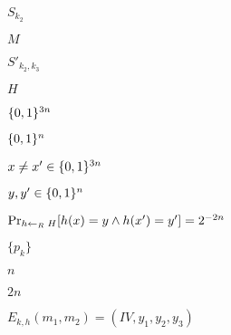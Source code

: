 \documentclass[10pt]{book}
\begin{document}
\begin{mdSnippets}
\begin{mdInlineSnippet}[0747e9221e93cfb00d3d40d118a88239]%
$S_{k_2}$\end{mdInlineSnippet}%
\begin{mdInlineSnippet}[69691c7bdcc3ce6d5d8a1361f22d04ac]%
$M$\end{mdInlineSnippet}%
\begin{mdInlineSnippet}[2241c878d01fb10bcb89591e5e72a22e]%
$S'_{k_2,k_3}$\end{mdInlineSnippet}%
\begin{mdInlineSnippet}[c1d9f50f86825a1a2302ec2449c17196]%
$H$\end{mdInlineSnippet}%
\begin{mdInlineSnippet}[6ba5b9daf1470df4cc0a64e898d406e0]%
$\{0,1\}^{3n}$\end{mdInlineSnippet}%
\begin{mdInlineSnippet}[5867c9b098884eca2779f6d98d4b0b29]%
$\{0,1\}^n$\end{mdInlineSnippet}%
\begin{mdInlineSnippet}%
$x\neq x'\in\{0,1\}^{3n}$\end{mdInlineSnippet}%
\begin{mdInlineSnippet}[202fde142b896c250ab7b35d3d6ad30f]%
$y,y'\in\{0,1\}^n$\end{mdInlineSnippet}%
\begin{mdInlineSnippet}[18a7c7573d945b5aacc7a79ed43c1650]%
$\Pr_{h\leftarrow_R\; H}[ h(x)=y \wedge h(x')=y' ]=2^{-2n}$\end{mdInlineSnippet}%
\begin{mdInlineSnippet}[794d2956e3379682bb8650ba84d7a1ef]%
$\{ p_k \}$\end{mdInlineSnippet}%
\begin{mdInlineSnippet}[7b8b965ad4bca0e41ab51de7b31363a1]%
$n$\end{mdInlineSnippet}%
\begin{mdInlineSnippet}[21e2c0c0472b331622877accbe29b91b]%
$2n$\end{mdInlineSnippet}%
\begin{mdInlineSnippet}[246f6c7162d36f8ec6beb143003399d9]%
$E_{k,h}(m_1,m_2) = (IV,y_1,y_2,y_3)$\end{mdInlineSnippet}%

\end{mdSnippets}
\end{document}
